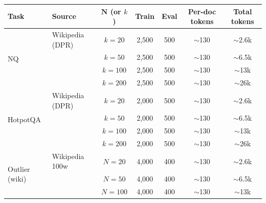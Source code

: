 \iffalse
\begin{table}[htbp]
\centering
\small
\setlength{\tabcolsep}{4pt}
\begin{tabular}{l l c c c c c}
\toprule
\textbf{Task} & \textbf{Source} & $\bm{N}$ (or $k$) & \textbf{Train} & \textbf{Eval} & \textbf{Per-doc tokens} & \textbf{Total tokens} \\
\midrule
\multirow{4}{*}{NQ}            & Wikipedia (DPR) & $k{=}20$  & 2{,}500 & 500 & $\sim$130 & $\sim$2.6k \\
                               &                 & $k{=}50$  & 2{,}500 & 500 & $\sim$130 & $\sim$6.5k \\
                               &                 & $k{=}100$ & 2{,}500 & 500 & $\sim$130 & $\sim$13k  \\
                               &                 & $k{=}200$ & 2{,}500 & 500 & $\sim$130 & $\sim$26k  \\
\midrule
\multirow{4}{*}{HotpotQA}      & Wikipedia (DPR) & $k{=}20$  & 2{,}000 & 500 & $\sim$130 & $\sim$2.6k \\
                               &                 & $k{=}50$  & 2{,}000 & 500 & $\sim$130 & $\sim$6.5k \\
                               &                 & $k{=}100$ & 2{,}000 & 500 & $\sim$130 & $\sim$13k  \\
                               &                 & $k{=}200$ & 2{,}000 & 500 & $\sim$130 & $\sim$26k  \\
\midrule
\multirow{3}{*}{Outlier (wiki)}& Wikipedia 100w  & $N{=}20$  & 4{,}000 & 400 & $\sim$130 & $\sim$2.6k \\
                               &                 & $N{=}50$  & 4{,}000 & 400 & $\sim$130 & $\sim$6.5k \\
                               &                 & $N{=}100$ & 4{,}000 & 400 & $\sim$130 & $\sim$13k  \\

\end{tabular}
\end{table}
